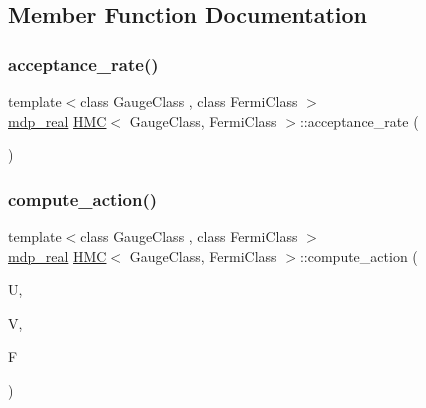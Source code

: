 \subsection{Member Function Documentation}
\mbox{\label{class_h_m_c_a29d58281eca79c9fdc0f6160d4c61b53}} 
\subsubsection{\texorpdfstring{acceptance\+\_\+rate()}{acceptance\_rate()}}
{\footnotesize\ttfamily template$<$class Gauge\+Class , class Fermi\+Class $>$ \\
\hyperlink{mdp__global__vars_8h_a69d96b74c791e0bbdb888b3913a69450}{mdp\+\_\+real} \hyperlink{class_h_m_c}{H\+MC}$<$ Gauge\+Class, Fermi\+Class $>$\+::acceptance\+\_\+rate (\begin{DoxyParamCaption}{ }\end{DoxyParamCaption})\hspace{0.3cm}{\ttfamily [inline]}}

\mbox{\label{class_h_m_c_a28b4077c0a378abdbc3a75b27b6ec66c}} 
\subsubsection{\texorpdfstring{compute\+\_\+action()}{compute\_action()}}
{\footnotesize\ttfamily template$<$class Gauge\+Class , class Fermi\+Class $>$ \\
\hyperlink{mdp__global__vars_8h_a69d96b74c791e0bbdb888b3913a69450}{mdp\+\_\+real} \hyperlink{class_h_m_c}{H\+MC}$<$ Gauge\+Class, Fermi\+Class $>$\+::compute\+\_\+action (\begin{DoxyParamCaption}\item[{Gauge\+Class \&}]{U,  }\item[{Gauge\+Class \&}]{V,  }\item[{Fermi\+Class \&}]{F }\end{DoxyParamCaption})\hspace{0.3cm}{\ttfamily [inline]}}

\mbox{\label{class_h_m_c_a4d455373ccf133c6a7bb59c13bc6db32}} 
